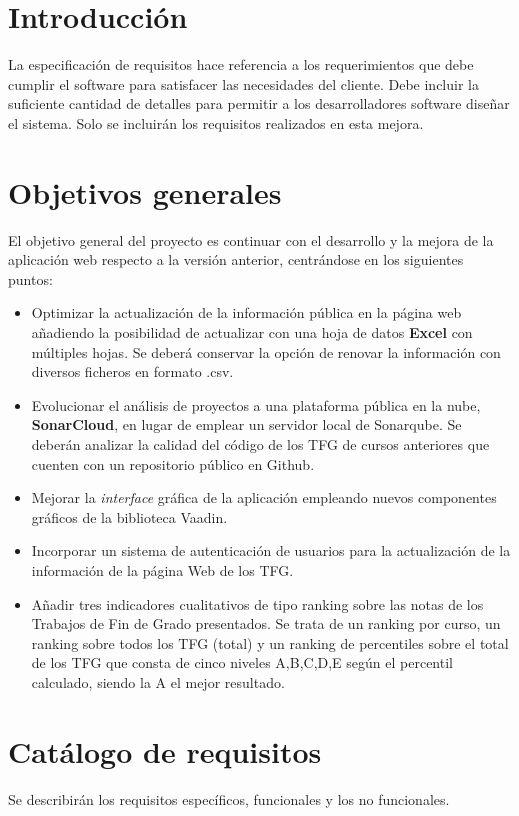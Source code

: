 
\section{Introducción}
La especificación de requisitos hace referencia a los requerimientos que debe cumplir el software para satisfacer las necesidades del cliente. Debe incluir la suficiente cantidad de detalles para permitir a los desarrolladores software diseñar el sistema.
Solo se incluirán los requisitos realizados en esta mejora.

\section{Objetivos generales}
El objetivo general del proyecto es continuar con el desarrollo y la mejora de la aplicación web respecto a la versión anterior, centrándose en los siguientes puntos:
\begin{itemize}
	\item Optimizar la actualización de la información pública en la página web añadiendo la posibilidad de actualizar con una hoja de datos \textbf{Excel} con múltiples hojas. Se deberá conservar la opción de renovar la información con diversos ficheros en formato .csv. 
	\item Evolucionar el análisis de proyectos a una plataforma pública en la nube, \textbf{SonarCloud}, en lugar de emplear un servidor local de Sonarqube. Se deberán analizar la calidad del código de los TFG de cursos anteriores que cuenten con un repositorio público en Github.
	\item Mejorar la \emph{interface} gráfica de la aplicación empleando nuevos componentes gráficos de la biblioteca Vaadin. 
	\item Incorporar un sistema de autenticación de usuarios para la actualización de la información de la página Web de los TFG.
	\item Añadir tres indicadores cualitativos de tipo ranking sobre las notas de los Trabajos de Fin de Grado presentados. Se trata de un ranking por curso, un ranking sobre todos los TFG (total) y un ranking de percentiles sobre el total de los TFG que consta de cinco niveles A,B,C,D,E según el percentil calculado, siendo la A el mejor resultado.
\end{itemize}

\section{Catálogo de requisitos}
Se describirán los requisitos específicos, funcionales y los no funcionales.

